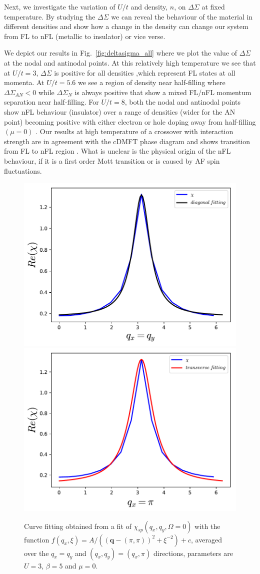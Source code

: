 Next, we investigate the variation of $U/t$ and density, $ n $, on $\Delta \Sigma$ at fixed temperature. By studying the $\Delta \Sigma$ we can reveal the behaviour of the material in different densities and show how a change in the density can change our system from FL to nFL (metallic to insulator) or vice verse. 

We depict our results in Fig.~\ref{fig:deltasigma_all} where we plot the value of $\Delta \Sigma$ at the nodal and antinodal points.  At this relatively high temperature we see that at $U/t=3$, $\Delta \Sigma$ is positive for all densities ,which represent FL states at all momenta. 
At $U/t=5.6$ we see a region of density near half-filling where $\Delta \Sigma_{AN}<0$ while $\Delta\Sigma_N$ is always positive that show a mixed FL/nFL momentum separation near half-filling.   For $U/t=8$, both the nodal and antinodal points show nFL behaviour (insulator) over a range of densities (wider for the AN point) becoming positive with either electron or hole doping away from half-filling $(\mu = 0)$ \cite{Gull10,gull:2009}.
Our results at high temperature of a crossover with interaction strength are in agreement with the cDMFT phase diagram and shows transition from FL to nFL region \cite{park}. What is unclear is the physical origin of the nFL behaviour, if it is a first order Mott transition or is caused by AF spin fluctuations.

\begin{figure}[ht]
\centering
    \includegraphics[width=0.6\linewidth]{fig3/fit.pdf}
    \includegraphics[width=0.6\linewidth]{fig3/fit1.pdf}
        \caption{\label{fig:fit}Curve fitting obtained from a fit of $\chi_{sp}(q_x,q_y,\Omega=0)$ with the function $f(q_x,\xi)=A/((\mathbf{q}-(\pi,\pi))^2+\xi^{-2}) +c $, averaged over the $q_x=q_y$ and $(q_x,q_y)=(q_x,\pi)$ directions, parameters are $U=3$, $\beta=5$ and $\mu=0$.\cite{rohringer:2016, gukelberger:2017}}
\end{figure}


